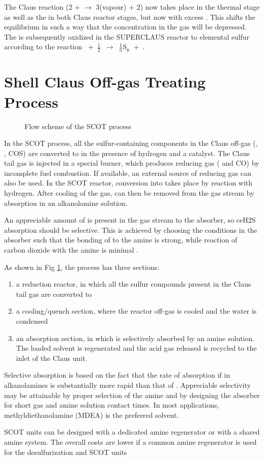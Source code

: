 The Claus reaction (2 +  $\longrightarrow$ 3(vapour) + 2) now takes place in the thermal stage as well as the in both Claus reactor stages, but now with excess . This shifts the equilibrium in such a way that the  concentration in the gas will be depressed. The  is subsequently oxidized in the SUPERCLAUS reactor to elemental sulfur according to the reaction \mbox{ + $\frac{1}{2}$ $\longrightarrow$ $\frac{1}{n}\text{S}_{\text{n}}$ + }.

\section{Shell Claus Off-gas Treating Process} \label{sec:SCOT}

\begin{figure}[htbp]
\centering
{}
\caption{Flow scheme of the SCOT process \citep{moulijn2001chemical}}
\label{fig:scot}
\end{figure}

In the SCOT process, all the sulfur-containing components in the Claus off-gas (, , COS) are converted to  in the presence of hydrogen and a catalyst. The Claus tail gas is injected in a special burner, which produces reducing gas ( and CO) by incomplete fuel combustion. If available, an external source of reducing gas can also be used. In the SCOT reactor, conversion into  takes place by reaction with hydrogen. After cooling of the gas,  can then be removed from the gas stream by absorption in an alkanolamine solution.

An appreciable amount of  is present in the gas stream to the absorber, so ce{H2S} absorption should be selective. This is achieved by choosing the conditions in the absorber such that the bonding of  to the amine is strong, while reaction of carbon dioxide with the amine is minimal \citep{moulijn2001chemical}.

As shown in Fig \ref{fig:scot}, the process has three sections:
\begin{enumerate}
\item a reduction reactor, in which all the sulfur compounds present in the Claus tail gas are
converted to 
\item a cooling/quench section, where the reactor off-gas is cooled and the water is condensed
\item an absorption section, in which  is selectively absorbed by an amine solution. The loaded solvent
is regenerated and the acid gas released is recycled to the inlet of the Claus unit.
\end{enumerate}
Selective absorption is based on the fact that the rate of absorption if  in alkanolamines is substantially more rapid than that of . Appreciable selectivity may be attainable by proper selection of the amine and by designing the absorber for short gas and amine solution contact times. In most applications, methyldiethanolamine (MDEA) is the preferred solvent.


SCOT units can be designed with a dedicated amine regenerator or with a shared amine system. The overall costs are lower if a common amine regenerator is used for the desulfurization and SCOT units \citep{Kohl1997670}